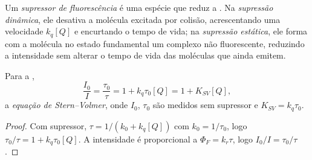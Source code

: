 \begin{definition}\label{def:b3:electronic-spectroscopy:quencher}
Um \emph{supressor de fluorescência} é uma espécie que
reduz a . Na \emph{supressão dinâmica}, ele
desativa a molécula excitada por colisão, acrescentando uma velocidade $k_q[Q]$ e
encurtando o tempo de vida; na \emph{supressão estática}, ele
forma com a molécula no estado fundamental um complexo não fluorescente, reduzindo
a intensidade sem alterar o tempo de vida das moléculas que ainda emitem.
\end{definition}

\begin{theorem}\label{thm:b3:electronic-spectroscopy:stern-volmer}
Para a ,
\[
\frac{I_0}{I} = \frac{\tau_0}{\tau} = 1 + k_q\tau_0[Q] = 1 + K_{SV}[Q],
\]
a \emph{equação de Stern--Volmer}, onde $I_0$, $\tau_0$
são medidos sem supressor e $K_{SV} = k_q\tau_0$.
\end{theorem}

\begin{proof}
Com supressor, $\tau = 1/(k_0 + k_q[Q])$ com $k_0 = 1/\tau_0$, logo $\tau_0/\tau = 1 +
k_q\tau_0[Q]$. A intensidade é proporcional a $\Phi_F = k_r\tau$, logo $I_0/I = \tau_0/\tau$.
\end{proof}

